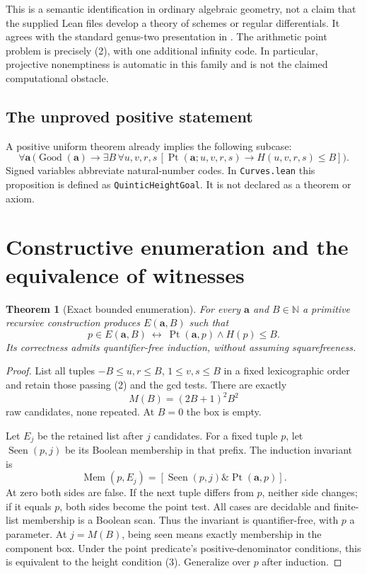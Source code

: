 \documentclass[11pt,letterpaper]{article}
\newcommand{\N}{\mathbb N}
\newcommand{\Good}{\operatorname{Good}}
\newcommand{\Pt}{\operatorname{Pt}}
\newtheorem{theorem}{Theorem}[section]
\theoremstyle{definition}
\begin{document}
This is a semantic identification in ordinary algebraic geometry, not
a claim that the supplied Lean files develop a theory of schemes or
regular differentials. It agrees with the standard genus-two presentation
in \cite{Stoll}. The arithmetic point problem is precisely (2), with
one additional infinity code. In particular, projective nonemptiness
is automatic in this family and is not the claimed computational obstacle.

\subsection{The unproved positive statement}
A positive uniform theorem already implies the following subcase:
\[
 \boxed{\ 
 \forall\mathbf a\,
 \bigl(\Good(\mathbf a)\to
 \exists B\,\forall u,v,r,s\,
 [\Pt(\mathbf a;u,v,r,s)\to H(u,v,r,s)\leq B]\bigr).
 \ }                                                     \tag{F$_5$}
 \label{eq:target}
\]
Signed variables abbreviate natural-number codes.
In \texttt{Curves.lean} this proposition is defined as
\texttt{QuinticHeightGoal}. It is not declared as a theorem or axiom.

\section{Constructive enumeration and the equivalence of witnesses}
\label{sec:enum}
\begin{theorem}[Exact bounded enumeration]\label{thm:enum}
For every $\mathbf a$ and $B\in\N$ a primitive recursive construction
produces $E(\mathbf a,B)$ such that
\[
 p\in E(\mathbf a,B)\ \longleftrightarrow\
                 \Pt(\mathbf a,p)\wedge H(p)\leq B.       \tag{5}
\]
Its correctness admits quantifier-free induction, without assuming
squarefreeness.
\end{theorem}
\begin{proof}
List all tuples $-B\leq u,r\leq B$, $1\leq v,s\leq B$ in a fixed
lexicographic order and retain those passing (2) and the gcd tests.
There are exactly
\[
                         M(B)=(2B+1)^2B^2                \tag{6}
\]
raw candidates, none repeated. At $B=0$ the box is empty.

Let $E_j$ be the retained list after $j$ candidates. For a fixed tuple
$p$, let $\operatorname{Seen}(p,j)$ be its Boolean membership in that
prefix. The induction invariant is
\[
 \operatorname{Mem}(p,E_j)=
       [\operatorname{Seen}(p,j)\mathbin{\&}\Pt(\mathbf a,p)].
                                                               \tag{7}
\]
At zero both sides are false. If the next tuple differs from $p$,
neither side changes; if it equals $p$, both sides become the point
test. All cases are decidable and finite-list membership is a Boolean
scan. Thus the invariant is quantifier-free, with $p$ a parameter.
At $j=M(B)$, being seen means exactly membership in the component box.
Under the point predicate's positive-denominator conditions, this is
equivalent to the height condition (3). Generalize over $p$ after induction.
\end{proof}
\end{document}
